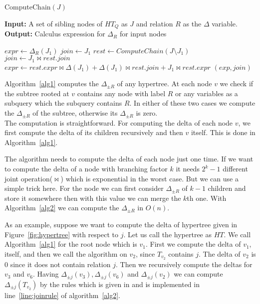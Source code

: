 \documentclass[12pt]{article}
\begin{document}
\begin{algorithm}[H]
\caption{ComputeChain$(J)$} 
\label{alg2}
\textbf{Input:} A set of sibling nodes of $HT_{Q}$ as $J$ and relation $R$ as the $\Delta$ variable.\\
\textbf{Output:} Calculus expression for $\Delta_{R}$ for input nodes\\
\begin{algorithmic}[1]
\STATE $expr\gets \Delta_{R}(J_{1})$ 
\STATE $join\gets J_{1}$
\ELSE
\STATE $rest\gets ComputeChain(J\setminus J_{1})$
\STATE $join\gets J_{1}\Join rest.join$
\STATE $expr\gets rest.expr\Join \Delta(J_{1})+\Delta(J_{1})\Join rest.join+J_{1}\Join rest.expr$ \label{line:joinrule}
\ENDIF
\RETURN $(exp,join)$
\end{algorithmic}
\end{algorithm}
Algorithm~\ref{alg1} computes the $\Delta_{\pm R}$ of any hypertree. At each node $v$ we check if the subtree rooted at $v$ contains any node with label $R$ or any variables as a subquery which the subquery contains $R$. In either of these two cases we compute the $\Delta_{\pm R}$ of the subtree, otherwise its $\Delta_{\pm R}$ is zero. \\
The computation is straightforward. For computing the delta of each node $v$, we first compute the delta of its children recursively  and then $v$ itself. This is done in Algorithm~\ref{alg1}. 
\par
The algorithm needs to compute the delta of each node just one time. If we want to compute the delta of a node with branching factor $k$ it needs $2^{k}-1$ different joint operation($\Join$) which is exponential in the worst case. But we can use a simple trick here. For the node we can first consider $\Delta_{\pm R}$ of $k-1$ children and store it somewhere then with this value we can merge the $k$th one. With Algorithm~\ref{alg2} we can compute the $\Delta_{\pm R}$ in $O(n)$.\par
As an example, suppose we want to compute the delta of hypertree given in Figure~\ref{fig:hypertree} with respect to $j$. Let us call the hypertree as $HT$. We call Algorithm~\ref{alg1} for the root node which is $v_{1}$. First we compute the delta of $v_{1}$, itself, and then we call the algorithm on $v_{2}$, since $T_{v_{2}}$ contains $j$. The delta of $v_{2}$ is 0 since it does not contain relation $j$. Then we recursively compute the deltas for $v_{3}$ and $v_{6}$. Having $\Delta_{\pm j}(v_{3}), \Delta_{\pm j}(v_{6})$ and $\Delta_{\pm j}(v_{2})$ we can compute $\Delta_{\pm j}(T_{v_{2}})$ by the rules which is given in \cite{2} and is implemented in line~\ref{line:joinrule} of algorithm~\ref{alg2}.
\end{document}

